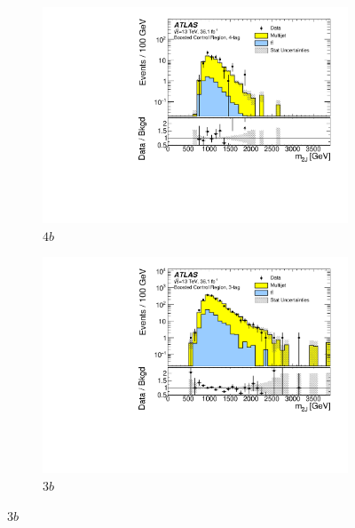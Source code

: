 \begin{figure}[htb!]
  \centering
  \captionsetup{justification=centering}
    \hspace{-2cm}
    \begin{subfigure}[b]{0.35\textwidth}
        \includegraphics[width=\textwidth,angle=-90]{figures/boosted/Paperplot/Moriond_bkg_9_FourTag_Control_mHH_l_1.pdf}
        \caption{$4b$}
        \label{fig:boosted-cr-mjj-4b}
    \end{subfigure}
    \quad \quad \quad \quad \quad
    \begin{subfigure}[b]{0.35\textwidth}
        \includegraphics[width=\textwidth,angle=-90]{figures/boosted/Paperplot/Moriond_bkg_9_ThreeTag_Control_mHH_l_1.pdf}
        \caption{$3b$}
        \label{fig:boosted-cr-mjj-3b}
    \end{subfigure}

\end{figure}

